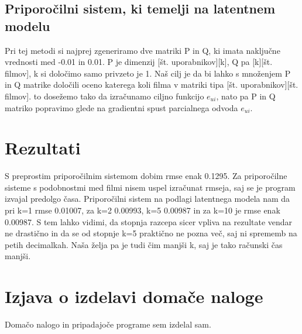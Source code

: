 \documentclass[a4paper,11pt]{article}
\begin{document}
\subsection{Priporočilni sistem, ki temelji na latentnem modelu}

Pri tej metodi si najprej zgeneriramo dve matriki P in Q, ki imata naključne vrednosti med -0.01 in 0.01. P je dimenzij [št. uporabnikov][k], Q pa [k][št. filmov], k si določimo samo privzeto je 1. Naš cilj je da bi lahko s množenjem P in Q matrike določili oceno katerega koli filma v matriki tipa [št. uporabnikov][št. filmov]. to dosežemo tako da izračunamo ciljno funkcijo $e_{ui}$, nato pa P in Q matriko popravimo glede na gradientni spust parcialnega odvoda $e_{ui}$.

\section{Rezultati}

S preprostim priporočilnim sistemom dobim rmse enak 0.1295. Za priporočilne sisteme s podobnostmi med filmi nisem uspel izračunat rmseja, saj se je program izvajal predolgo časa. Priporočilni sistem na podlagi latentnega modela nam da pri k=1 rmse 0.01007, za k=2 0.00993, k=5 0.00987 in za k=10 je rmse enak 0.00987. S tem lahko vidimi, da stopnja razcepa sicer vpliva na rezultate vendar ne drastično in da se od stopnje k=5 praktično ne pozna več, saj ni sprememb na petih decimalkah. Naša želja pa je tudi čim manjši k, saj je tako računski čas manjši.

\section{Izjava o izdelavi domače naloge}
Domačo nalogo in pripadajoče programe sem izdelal sam.
\end{document}
